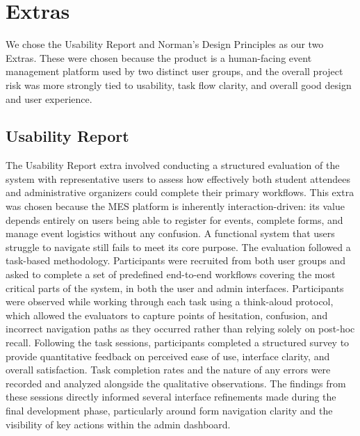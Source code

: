 \documentclass{article}
\begin{document}
\section{Extras}

We chose the Usability Report and Norman's Design Principles as our two Extras. These were chosen because the product is a human-facing event management platform used by two distinct user groups, and the overall project risk was more strongly tied to usability, task flow clarity, and overall good design and user experience.

\subsection*{Usability Report}

The Usability Report extra involved conducting a structured evaluation of the system with representative users to assess how effectively both student attendees and administrative organizers could complete their primary workflows. This extra was chosen because the MES platform is inherently interaction-driven: its value depends entirely on users being able to register for events, complete forms, and manage event logistics without any confusion. A functional system that users struggle to navigate still fails to meet its core purpose. \newline
\newline
The evaluation followed a task-based methodology. Participants were recruited from both user groups and asked to complete a set of predefined end-to-end workflows covering the most critical parts of the system, in both the user and admin interfaces. Participants were observed while working through each task using a think-aloud protocol, which allowed the evaluators to capture points of hesitation, confusion, and incorrect navigation paths as they occurred rather than relying solely on post-hoc recall.\newline
\newline
Following the task sessions, participants completed a structured survey to provide quantitative feedback on perceived ease of use, interface clarity, and overall satisfaction. Task completion rates and the nature of any errors were recorded and analyzed alongside the qualitative observations. The findings from these sessions directly informed several interface refinements made during the final development phase, particularly around form navigation clarity and the visibility of key actions within the admin dashboard.
\end{document}
